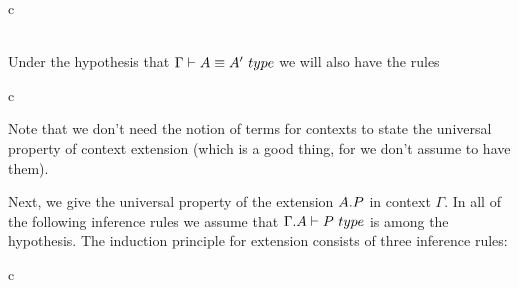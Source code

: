 \begin{infarray}{c}
\inference{}
{}\\
  {}\\
  {}
\end{infarray}

Under the hypothesis that $\jtypeeq{\Gamma}{A}{A'}$
we will also have the rules

\begin{infarray}{c}
\\
{}
\end{infarray}

Note that we don't need the notion of terms for contexts to state the universal
property of context extension (which is a good thing, for we don't assume to have them).

Next, we give the universal property of the extension $\ctxext{A}{P}$ in context
$\Gamma$.
In all of the following inference rules we assume that $\jtype{\ctxext{\Gamma}{A}}{P}$
is among the hypothesis. The induction principle for extension consists of three
inference rules:

\begin{infarray}{c}
\inference{}
{}\\
  {}\\
  {}
\end{infarray}

